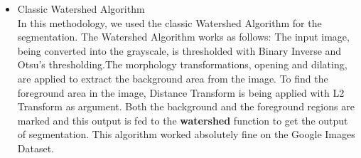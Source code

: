 \documentclass[12pt,a4paper]{article}
\begin{document}
\begin{itemize}


%
    

%
\newpage

\item Classic Watershed Algorithm \\

In this methodology, we used the classic Watershed Algorithm for the segmentation. The Watershed Algorithm works as follows: The input image, being converted into the grayscale, is thresholded with Binary Inverse and Otsu's thresholding.The morphology transformations, opening and dilating, are applied to extract the background area from the image. To find the foreground area in the image, Distance Transform is being applied with L2 Transform as argument. Both the background and the foreground regions are marked and this output is fed to the \textbf{watershed} function to get the output of segmentation. This algorithm worked absolutely fine on the Google Images Dataset.
    


\end{itemize}
\end{document}
